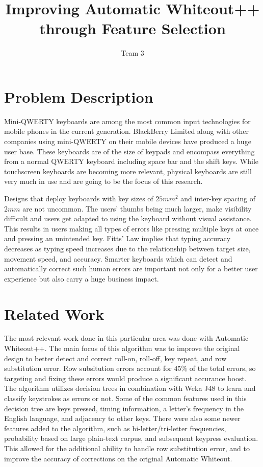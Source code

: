 \documentclass[letterpaper, 10 pt, conference]{ieeeconf}  %
\title{\LARGE \bf
Improving Automatic Whiteout++ through Feature Selection
}
\author{Team 3}
\begin{document}
\maketitle
\thispagestyle{empty}
\pagestyle{empty}
\nocite{*} %

\section{Problem Description}
Mini-QWERTY keyboards are among the most common input technologies for mobile phones in the current generation. BlackBerry Limited along with other companies using mini-QWERTY on their mobile devices have produced a huge user base. These keyboards are of the size of keypads and encompass everything from a normal QWERTY keyboard including space bar and the shift keys.  While touchscreen keyboards are becoming more relevant, physical keyboards are still very much in use and are going to be the focus of this research.

Designs that deploy keyboards with key sizes of $25 mm^{2}$ and inter-key spacing of $2 mm$\cite{clawson2006mobile} are not uncommon. The users’ thumbs being much larger, make visibility difficult and users get adapted to using the keyboard without visual assistance. This results in users making all types of errors like pressing multiple keys at once and pressing an unintended key. Fitts’ Law implies that typing accuracy decreases as typing speed increases due to the relationship between target size, movement speed, and accuracy\cite{soukoreff2004towards}.  Smarter keyboards which can detect and automatically correct such human errors are important not only for a better user experience but also carry a huge business impact.

\section{Related Work}
The most relevant work done in this particular area was done with Automatic Whiteout++.  The main focus of this algorithm was to improve the original design to better detect and correct roll-on, roll-off, key repeat, and row substitution error.  Row subsitution errors account for $45\%$ of the total errors, so targeting and fixing these errors would produce a significant accurance boost\cite{clawson2008automatic}.  The algorithm utilizes decision trees in combination with Weka J48 to learn and classify keystrokes as errors or not.  Some of the common features used in this decision tree are keys pressed, timing information, a letter’s frequency in the English language, and adjacency to other keys.  There were also some newer features added to the algorithm, such as bi-letter/tri-letter frequencies, probability based on large plain-text corpus, and subsequent keypress evaluation.  This allowed for the additional ability to handle row substitution error, and to improve the accuracy of corrections on the original Automatic Whiteout.
\end{document}

